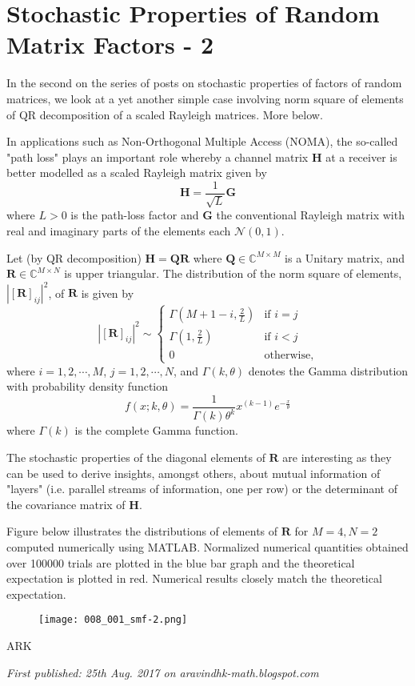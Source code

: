 \section{Stochastic Properties of Random Matrix Factors - 2}

In the second on the series of posts on stochastic properties of factors of random matrices, we look at a yet another simple case involving norm square of elements of QR decomposition of a scaled Rayleigh matrices. More below.

In applications such as Non-Orthogonal Multiple Access (NOMA), the so-called "path loss" plays an important role whereby a channel matrix $\mathbf{H}$ at a receiver is better modelled as a scaled Rayleigh matrix given by $$\mathbf{H} = \frac{1}{\sqrt{L}} \mathbf{G}$$ where $L > 0$ is the path-loss factor and $\mathbf{G}$ the conventional Rayleigh matrix with real and imaginary parts of the elements each $\mathcal{N}(0,1)$.

Let (by QR decomposition) $\mathbf{H} = \mathbf{Q}\mathbf{R}$ where $\mathbf{Q} \in \mathbb{C}^{M\times M}$ is a Unitary matrix, and $\mathbf{R} \in \mathbb{C}^{M\times N}$ is upper triangular. The distribution of the norm square of elements, $|[\mathbf{R}]_{ij}|^2$, of $\mathbf{R}$ is given by $$|[\mathbf{R}]_{ij}|^2 \sim \begin{cases} \Gamma(M+1-i,\frac{2}{L}) & \text{if $i = j$} \\ \Gamma(1,\frac{2}{L}) & \text{if $i < j$} \\ 0 & \text{otherwise,} \end{cases}$$ where $i=1,2,\cdots,M$, $j=1,2,\cdots,N$, and $\Gamma(k,\theta)$ denotes the Gamma distribution with probability density function $$f(x; k,\theta) = \frac{1}{\Gamma(k)\theta^k}x^{(k-1)}e^{-\frac{x}{\theta}}$$ where $\Gamma(k)$ is the complete Gamma function.

The stochastic properties of the diagonal elements of $\mathbf{R}$ are interesting as they can be used to derive insights, amongst others, about mutual information of "layers" (i.e. parallel streams of information, one per row) or the determinant of the covariance matrix of $\mathbf{H}$.

Figure below illustrates the distributions of elements of $\mathbf{R}$ for $M=4, N=2$ computed numerically using MATLAB. Normalized numerical quantities obtained over 100000 trials are plotted in the blue bar graph and the theoretical expectation is plotted in red. Numerical results closely match the theoretical expectation.

\begin{figure}[H]
	\centering
	\texttt{[image: 008\_001\_smf-2.png]}
\end{figure}

ARK

\emph{First published: 25th Aug. 2017 on aravindhk-math.blogspot.com}
